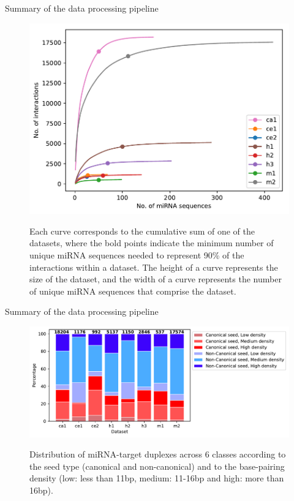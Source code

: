 \documentclass{beamer}
\begin{document}
\begin{frame}{Summary of the data processing pipeline}

\begin{figure}[h!]
  \caption{\textbf{Cumulative sum of miRNA sequence appearances in the examined datasets}}
      \includegraphics[width=\textwidth]{images/1_mirna_dist.pdf}
      \label{fig:datasetplot}
      \caption*{Each curve corresponds to the cumulative sum of one of the datasets, where the bold points indicate the minimum number of unique miRNA sequences needed to represent 90\% of the interactions within a dataset. The height of a curve represents the size of the dataset, and the width of a curve represents the number of unique miRNA sequences that comprise the dataset.}
      \end{figure}
\end{frame}

\begin{frame}{Summary of the data processing pipeline}

\begin{figure}[h!]
  \caption{\textbf{Classification of the miRNA-target duplexes based on their base-pairing patterns}} 
    \includegraphics[width = 1\textwidth]{images/2_seed_type_positive2.pdf}
      \label{fig:seed_type_pos}
      \caption*{Distribution of miRNA-target duplexes across 6 classes according to the seed type (canonical and non-canonical) and to the base-pairing density (low: less than 11bp, medium: 11-16bp and high: more than 16bp).}

      \end{figure}
\end{frame}
      
\end{document}

